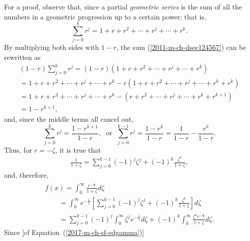 {\color{OliveGreen}
\bproof

For a proof, observe that,
since
a partial {\em geometric series}
is the sum of all the numbers in a geometric progression up to a certain power;
that is,
\begin{equation}
\sum_{j=0}^k r^j =   1+r+r^2+ \cdots +r^j+ \cdots +r^k .
\label{2011-m-ch-dsee124567}
\end{equation}
By multiplying both sides with $1-r$,
the sum (\ref{2011-m-ch-dsee124567}) can be rewritten as
\begin{equation}
\begin{split}
(1-r) \sum_{j=0}^k r^j=
(1-r) (1+ r+r^2+ \cdots +r^j+ \cdots +r^k)\\
=1+ r+r^2+ \cdots +r^j+ \cdots +r^k -
r(1+r+r^2+ \cdots +r^j+ \cdots +r^k +r^k) \\
=1+ r+r^2+ \cdots +r^j+ \cdots +r^k -
(r+r^2+ \cdots +r^j+ \cdots +r^k +r^{k+1}) \\
= 1-r^{k+1}
,
\end{split}
\end{equation}
and, since the middle terms all cancel out,
\begin{equation}
\sum_{j=0}^k r^j =  \frac{1-r^{k+1}}{1-r},
\;
\textrm{ or }
\;
\sum_{j=0}^{k-1} r^j =  \frac{1-r^{k}}{1-r}  =  \frac{1}{1-r} - \frac{r^{k}}{1-r}
.
\label{2011-m-ch-dsee12}
\end{equation}
Thus, for $r=-\zeta$, it is true that
\begin{equation}
\begin{split}
\frac{1}{1+\zeta}=\sum_{j=0}^{k-1} (-1)^j \zeta^j + (-1)^k \frac{\zeta^k}{1+\zeta},
\end{split}
\label{2011-m-ch-dsee13}
\end{equation}
and, therefore,
\begin{equation}
\begin{split}
f(x) =\int_0^\infty \frac{e^{-\frac{\zeta}{x}}}{1+\zeta}d\zeta \\
\qquad =
\int_0^\infty  e^{-\frac{\zeta}{x}}\left[
\sum_{j=0}^{k-1} (-1)^j \zeta^j + (-1)^k \frac{\zeta^k}{1+\zeta}
\right]
d\zeta \\
\qquad =
\sum_{j=0}^{k-1}(-1)^j\int_0^\infty  \zeta^j  e^{-\frac{\zeta}{x}}   d\zeta
 +
(-1)^k \int_0^\infty \frac{\zeta^ke^{-\frac{\zeta}{x}}}{1+\zeta}
d\zeta  .
\end{split}
\label{2011-m-ch-dsee14}
\end{equation}
Since [cf Equation~(\ref{2017-m-ch-sf-edgamma})]
\begin{equation}

\end{equation}}
